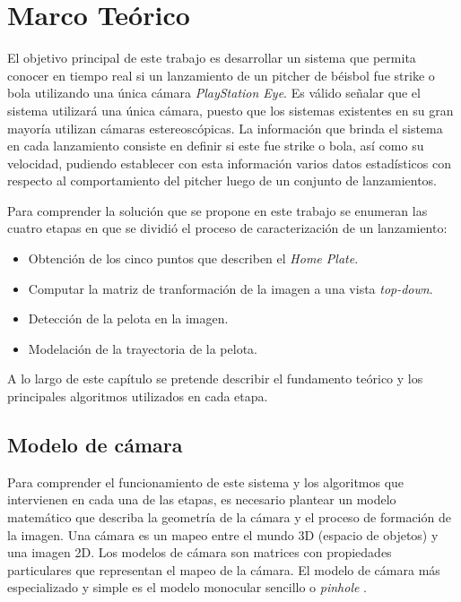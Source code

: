 \chapter{Marco Teórico}\label{chapter:theorical}

El objetivo principal de este trabajo es desarrollar un sistema que permita conocer en tiempo real si un lanzamiento de un pitcher de béisbol fue strike o bola utilizando una única cámara \textit{PlayStation Eye}. Es válido señalar que el sistema utilizará una única cámara, puesto que los sistemas existentes en su gran mayoría utilizan cámaras estereoscópicas. La información que brinda el sistema en cada lanzamiento consiste en definir si este fue strike o bola, así como su velocidad, pudiendo establecer con esta información varios datos estadísticos con respecto al comportamiento del pitcher luego de un conjunto de lanzamientos.

Para comprender la solución que se propone en este trabajo se enumeran las cuatro etapas en que se dividió el proceso de caracterización de un lanzamiento:

\begin{itemize}
    \item Obtención de los cinco puntos que describen el \textit{Home Plate}.
    \item Computar la matriz de tranformación de la imagen a una vista \textit{top-down}.
    \item Detección de la pelota en la imagen.
    \item Modelación de la trayectoria de la pelota.
\end{itemize}

A lo largo de este capítulo se pretende describir el fundamento teórico y los principales algoritmos utilizados en cada etapa.

\section{Modelo de cámara}

Para comprender el funcionamiento de este sistema y los algoritmos que intervienen en cada una de las etapas, es necesario plantear un modelo matemático que describa la geometría de la cámara y el proceso de formación de la imagen. Una cámara es un mapeo entre el mundo 3D (espacio de objetos) y una imagen 2D. Los modelos de cámara son matrices con propiedades particulares que representan el mapeo de la cámara. El modelo de cámara más especializado y simple es el modelo monocular sencillo o \textit{pinhole} \cite{RichardAndrew}.\\

